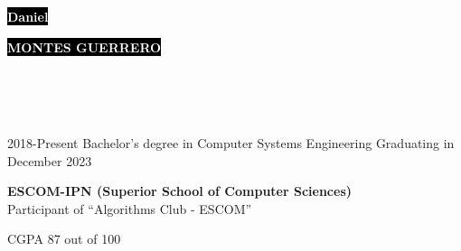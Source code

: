 \documentclass[9pt]{developercv} %
\begin{document}

\begin{minipage}[t]{0.70\textwidth} %
	\vspace{-\baselineskip} %
	
	\colorbox{black}{{\HUGE\textcolor{white}{\textbf{{Daniel}}}}} %
	
	\colorbox{black}{{\HUGE\textcolor{white}{\textbf{{MONTES GUERRERO}}}}} %
	
	\vspace{6pt}
\end{minipage}
\begin{minipage}[t]{0.3\textwidth} %
	\vspace{-\baselineskip} %
	
	\\
	\\
	\\
\end{minipage}



\begin{entrylist}
	\entry
		{2018-Present}
		{Bachelor’s degree in Computer Systems Engineering}
		{Graduating in December 2023}
		{\textbf{ESCOM-IPN (Superior School of Computer Sciences)}\\
		Participant of ``Algorithms Club - ESCOM''
		 \begin{flushright}
		 	CGPA 87 out of 100
		 \end{flushright}
		}
\end{entrylist}
\end{document}
